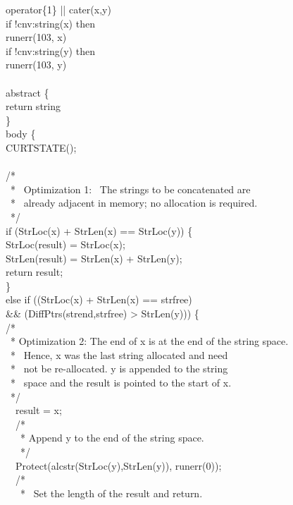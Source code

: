 \begin{iconcode}
\>operator\{1\} || cater(x,y)\\
\>if !cnv:string(x) then\\
\>\>runerr(103, x)\\
\>if !cnv:string(y) then\\
\>\>runerr(103, y)\\
\\
\>abstract \{\\
\>\>return string\\
\>\>\}\\
\>body \{\\
\>\>CURTSTATE();\\
\\
\>\>/*\\
\>\>\ * \ Optimization 1: \ The strings to be concatenated are\\
\>\>\ * \ already adjacent in memory; no allocation is required.\\
\>\>\ */\\
\>\>if (StrLoc(x) + StrLen(x) == StrLoc(y)) \{\\
\>\>\>StrLoc(result) = StrLoc(x);\\
\>\>\>StrLen(result) = StrLen(x) + StrLen(y);\\
\>\>\>return result;\\
\>\>\>\}\\
\>\>else if ((StrLoc(x) + StrLen(x) == strfree)\\
\>\>\&\& (DiffPtrs(strend,strfree) > StrLen(y))) \{\\
\>\>\>/*\\
\>\>\>\ * Optimization 2: The end of x is at the end of the string space.\\
\>\>\>\ * \ Hence, x was the last string allocated and need\\
\>\>\>\ * \ not be re-allocated. y is appended to the string\\
\>\>\>\ * \ space and the result is pointed to the start of x.\\
\>\>\>\ */\\
\ \  result = x;\\
\ \  /*\\
\ \  \ * Append y to the end of the string space.\\
\ \  \ */\\
\ \  Protect(alcstr(StrLoc(y),StrLen(y)), runerr(0));\\
\ \  /*\\
\ \  \ * \ Set the length of the result and return.\\

\end{iconcode}
